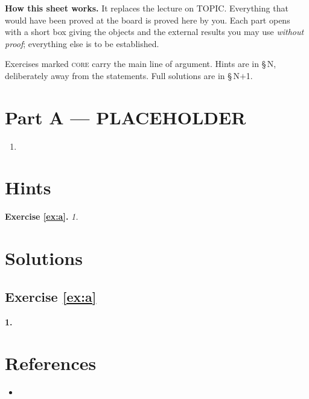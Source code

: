 \documentclass[11pt,a4paper]{article}
\begin{document}

\vspace{6pt}

\begin{plainbox}
\textbf{How this sheet works.} It replaces the lecture on TOPIC. Everything that
would have been proved at the board is proved here by you. Each part opens with a
short box giving the objects and the external results you may use \emph{without
proof}; everything else is to be established.

\smallskip
Exercises marked \textsc{core} carry the main line of argument. Hints are in §\,N,
deliberately away from the statements. Full solutions are in §\,N$+$1.
\end{plainbox}

\newpage
\tableofcontents
\newpage

\section{Part A --- PLACEHOLDER}

\begin{setting}
\end{setting}

\begin{exercise}\label{ex:a}
\leavevmode
\begin{enumerate}[label=\textbf{\arabic*.}]
\item
\end{enumerate}
\end{exercise}

\newpage
\section{Hints}

\noindent\textbf{Exercise \ref{ex:a}.} \emph{1.}

\ifsolutions
\newpage
\section{Solutions}

\subsection*{Exercise \ref{ex:a}}

\textbf{1.}
\fi

\newpage
\section*{References}

\begin{itemize}[leftmargin=*, itemsep=4pt]
\item
\end{itemize}
\end{document}
